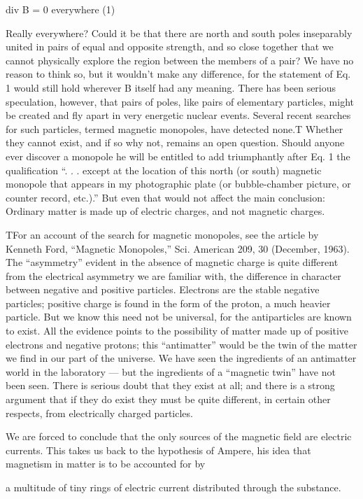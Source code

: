 div B = 0 everywhere (1)

Really everywhere? Could it be that there are north and south
poles inseparably united in pairs of equal and opposite strength, and
so close together that we cannot physically explore the region between
the members of a pair? We have no reason to think so, but
it wouldn't make any difference, for the statement of Eq. 1 would
still hold wherever B itself had any meaning. There has been serious
speculation, however, that pairs of poles, like pairs of elementary
particles, might be created and fly apart in very energetic nuclear
events. Several recent searches for such particles, termed magnetic
monopoles, have detected none.T Whether they cannot exist, and
if so why not, remains an open question. Should anyone ever discover
a monopole he will be entitled to add triumphantly after Eq. 1
the qualification ``. . . except at the location of this north (or south)
magnetic monopole that appears in my photographic plate (or
bubble-chamber picture, or counter record, etc.).'' But even that
would not affect the main conclusion: Ordinary matter is made up
of electric charges, and not magnetic charges.

TFor an account of the search for magnetic monopoles, see the article by Kenneth
Ford, ``Magnetic Monopoles,'' Sci. American 209, 30 (December, 1963). The 
``asymmetry'' evident in the absence of magnetic charge is quite different from the electrical
asymmetry we are familiar with, the difference in character between negative and
positive particles. Electrons are the stable negative particles; positive charge is found
in the form of the proton, a much heavier particle. But we know this need not be
universal, for the antiparticles are known to exist. All the evidence points to the possibility
of matter made up of positive electrons and negative protons; this ``antimatter''
would be the twin of the matter we find in our part of the universe. We have seen the
ingredients of an antimatter world in the laboratory --- but the ingredients of a 
``magnetic twin'' have not been seen. There is serious doubt that they exist at all; and
there is a strong argument that if they do exist they must be quite different, in certain
other respects, from electrically charged particles.

We are forced to conclude that the only sources of the magnetic
field are electric currents. This takes us back to the hypothesis of
Ampere, his idea that magnetism in matter is to be accounted for by

a multitude of tiny rings of electric current distributed through the
substance.

